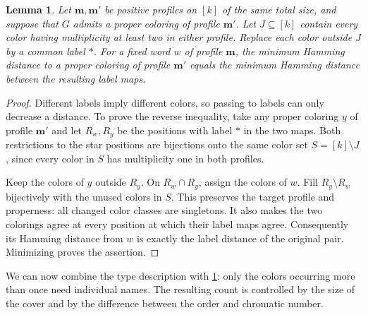 \documentclass[11pt,reqno]{amsart}
\numberwithin{equation}{section}
\newtheorem{lemma}[theorem]{Lemma}
\theoremstyle{definition}
\theoremstyle{remark}
\begin{document}
\begin{lemma}\label{rec:singleton}
Let $\mathbf m,\mathbf m'$ be positive profiles on $[k]$ of the
same total size, and suppose that $G$ admits a proper coloring of
profile $\mathbf m'$. Let $J\subseteq[k]$ contain every color having
multiplicity at least two in either profile. Replace each color
outside $J$ by a common label $*$. For a fixed word $w$ of profile
$\mathbf m$, the minimum Hamming distance to a proper coloring of
profile $\mathbf m'$ equals the minimum Hamming distance between
the resulting label maps.
\end{lemma}
\begin{proof}
Different labels imply different colors, so passing to labels can
only decrease a distance. To prove the reverse inequality, take any
proper coloring $y$ of profile $\mathbf m'$ and let $R_w,R_y$ be
the positions with label $*$ in the two maps. Both restrictions
to the star positions are bijections onto the same color set
$S=[k]\setminus J$, since every color in $S$ has multiplicity one
in both profiles.

Keep the colors of $y$ outside $R_y$. On $R_w\cap R_y$, assign the
colors of $w$. Fill $R_y\setminus R_w$ bijectively with the unused
colors in $S$. This preserves the target profile and properness:
all changed color classes are singletons. It also makes the two
colorings agree at every position at which their label maps agree.
Consequently its Hamming distance from $w$ is exactly the label
distance of the original pair. Minimizing proves the assertion.
\end{proof}

We can now combine the type description with \cref{rec:singleton}:
only the colors occurring more than once need individual names.
The resulting count is controlled by the size of the cover and by
the difference between the order and chromatic number.
\end{document}
